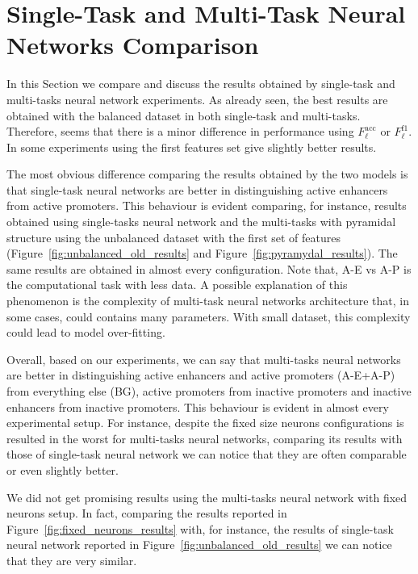 \section{Single-Task and Multi-Task Neural Networks Comparison}
\label{sec:results_discussion}
In this Section we compare and discuss the results obtained by single-task and multi-tasks neural network experiments. As already seen, the best results are obtained with the balanced dataset in both single-task and multi-tasks. Therefore, seems that there is a minor difference in performance using $F_\ell^{\textrm{acc}}$ or $F_\ell^{\textrm{f1}}$. In some experiments using the first features set give slightly better results. 

The most obvious difference comparing the results obtained by the two models is that single-task neural networks are better in distinguishing active enhancers from active promoters. This behaviour is evident comparing, for instance, results obtained using single-tasks neural network and the multi-tasks with pyramidal structure using the unbalanced dataset with the first set of features (Figure~\ref{fig:unbalanced_old_results} and Figure~\ref{fig:pyramydal_results}). The same results are obtained in almost every configuration. Note that, A-E vs A-P is the computational task with less data. A possible explanation of this phenomenon is the complexity of multi-task neural networks architecture that, in some cases, could contains many parameters. With small dataset, this complexity could lead to model over-fitting. 

Overall, based on our experiments, we can say that multi-tasks neural networks are better in distinguishing active enhancers and active promoters (A-E+A-P) from everything else (BG), active promoters from inactive promoters and inactive enhancers from inactive promoters. This behaviour is evident in almost every experimental setup. For instance, despite the fixed size neurons configurations is resulted in the worst for multi-tasks neural networks, comparing its results with those of single-task neural network we can notice that they are often comparable or even slightly better.

We did not get promising results using the multi-tasks neural network with fixed neurons setup. In fact, comparing the results reported in Figure~\ref{fig:fixed_neurons_results} with, for instance, the results of single-task neural network reported in Figure~\ref{fig:unbalanced_old_results} we can notice that they are very similar.

